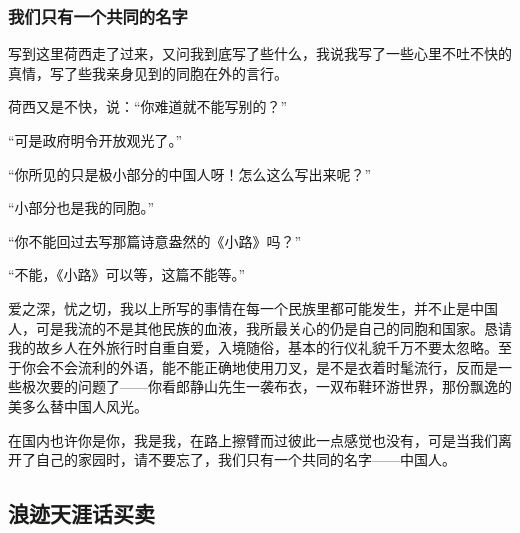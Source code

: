 \subsubsection*{我们只有一个共同的名字}
\par 写到这里荷西走了过来，又问我到底写了些什么，我说我写了一些心里不吐不快的真情，写了些我亲身见到的同胞在外的言行。
\par 荷西又是不快，说：“你难道就不能写别的？”
\par “可是政府明令开放观光了。”
\par “你所见的只是极小部分的中国人呀！怎么这么写出来呢？”
\par “小部分也是我的同胞。”
\par “你不能回过去写那篇诗意盎然的《小路》吗？”
\par “不能，《小路》可以等，这篇不能等。”
\par 爱之深，忧之切，我以上所写的事情在每一个民族里都可能发生，并不止是中国人，可是我流的不是其他民族的血液，我所最关心的仍是自己的同胞和国家。恳请我的故乡人在外旅行时自重自爱，入境随俗，基本的行仪礼貌千万不要太忽略。至于你会不会流利的外语，能不能正确地使用刀叉，是不是衣着时髦流行，反而是一些极次要的问题了——你看郎静山先生一袭布衣，一双布鞋环游世界，那份飘逸的美多么替中国人风光。
\par 在国内也许你是你，我是我，在路上擦臂而过彼此一点感觉也没有，可是当我们离开了自己的家园时，请不要忘了，我们只有一个共同的名字——中国人。





\subsection{浪迹天涯话买卖}


